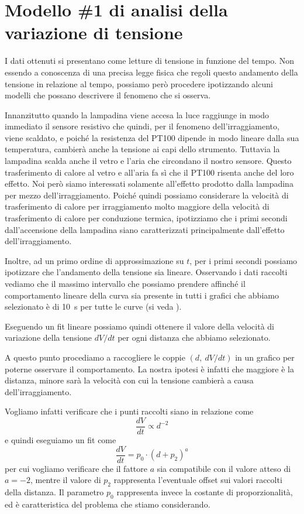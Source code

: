 \documentclass[
    rmp,
    reprint, 
    superscriptaddress, 
    altaffilletter, 
    amsmath, 
    amssymb,
    a4paper]{revtex4-2}
\begin{document}
\section*{Modello \#1 di analisi della variazione di tensione}
I dati ottenuti si presentano come letture di tensione in funzione del tempo. Non essendo a conoscenza di una precisa legge fisica che regoli questo andamento della tensione in relazione al tempo, possiamo però procedere ipotizzando alcuni modelli che possano descrivere il fenomeno che si osserva. 

Innanzitutto quando la lampadina viene accesa la luce raggiunge in modo immediato il sensore resistivo che quindi, per il fenomeno dell'irraggiamento, viene scaldato, e poiché la resistenza del PT100 dipende in modo lineare dalla sua temperatura, cambierà anche la tensione ai capi dello strumento. Tuttavia la lampadina scalda anche il vetro e l'aria che circondano il nostro sensore. Questo trasferimento di calore al vetro e all'aria fa sì che il PT100 risenta anche del loro effetto. Noi però siamo interessati solamente all'effetto prodotto dalla lampadina per mezzo dell'irraggiamento. Poiché quindi possiamo considerare la velocità di trasferimento di calore per irraggiamento molto maggiore della velocità di trasferimento di calore per conduzione termica, ipotizziamo che i primi secondi dall'accensione della lampadina siano caratterizzati principalmente dall'effetto dell'irraggiamento. 

Inoltre, ad un primo ordine di approssimazione su $t$, per i primi secondi possiamo ipotizzare che l'andamento della tensione sia lineare. Osservando i dati raccolti vediamo che il massimo intervallo che possiamo prendere affinché il comportamento lineare della curva sia presente in tutti i grafici che abbiamo selezionato è di \SI{10}{\second} per tutte le curve (si veda ). 

Eseguendo un fit lineare possiamo quindi ottenere il valore della velocità di variazione della tensione $dV/dt$ per ogni distanza che abbiamo selezionato.

A questo punto procediamo a raccogliere le coppie $(d,~dV/dt)$ in un grafico per poterne osservare il comportamento. La nostra ipotesi è infatti che maggiore è la distanza, minore sarà la velocità con cui la tensione cambierà a causa dell'irraggiamento. 

Vogliamo infatti verificare che i punti raccolti siano in relazione come 
\[
    \frac{dV}{dt} \propto d^{-2}
\]
e quindi eseguiamo un fit come
\begin{equation}\label{eq:modello_plot}
    \frac{dV}{dt} = p_0\cdot(d+p_2)^{a}
\end{equation}
per cui vogliamo verificare che il fattore $a$ sia compatibile con il valore atteso di $a = -2$, mentre il valore di $p_2$ rappresenta l'eventuale offset sui valori raccolti della distanza. Il parametro $p_0$ rappresenta invece la costante di proporzionalità, ed è caratteristica del problema che stiamo considerando.
\end{document}
